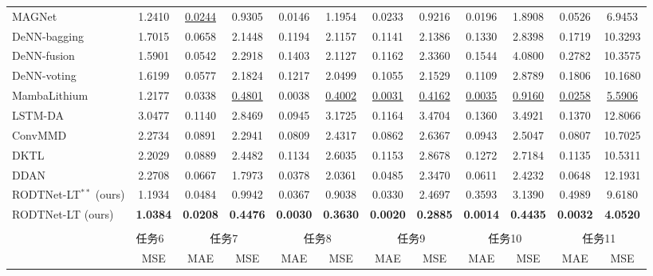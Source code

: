 \documentclass[lettersize,onecolumn]{IEEEtran}
\begin{document}
\begin{table}[htbp]
{\begin{threeparttable}
\begin{tabular}{lccccccccccc}
    MAGNet \cite{TAN2024103725} & 1.2410  & \underline{0.0244}  & 0.9305  & 0.0146  & 1.1954  & 0.0233  & 0.9216  & 0.0196  & 1.8908  & 0.0526  & 6.9453  \\
    DeNN-bagging \cite{10102497} & 1.7015  & 0.0658  & 2.1448  & 0.1194  & 2.1157  & 0.1141  & 2.1386  & 0.1330  & 2.8398  & 0.1719  & 10.3293  \\
    DeNN-fusion \cite{10102497} & 1.5901  & 0.0542  & 2.2918  & 0.1403  & 2.1127  & 0.1162  & 2.3360  & 0.1544  & 4.0800  & 0.2782  & 10.3575  \\
    DeNN-voting \cite{10102497} & 1.6199  & 0.0577  & 2.1824  & 0.1217  & 2.0499  & 0.1055  & 2.1529  & 0.1109  & 2.8789  & 0.1806  & 10.1680  \\
    MambaLithium \cite{shi2024mambalithiumselectivestatespace} & 1.2177  & 0.0338  & \underline{0.4801}  & 0.0038  & \underline{0.4002}  & \underline{0.0031}  & \underline{0.4162}  & \underline{0.0035}  & \underline{0.9160}  & \underline{0.0258}  & \underline{5.5906}  \\
    LSTM-DA \cite{HAN2022230823} & 3.0477  & 0.1140  & 2.8469  & 0.0945  & 3.1725  & 0.1164  & 3.4704  & 0.1360  & 3.4921  & 0.1370  & 12.8066  \\
    ConvMMD \cite{9788003} & 2.2734  & 0.0891  & 2.2941  & 0.0809  & 2.4317  & 0.0862  & 2.6367  & 0.0943  & 2.5047  & 0.0807  & 10.7025  \\
    DKTL \cite{10029904}  & 2.2029  & 0.0889  & 2.4482  & 0.1134  & 2.6035  & 0.1153  & 2.8678  & 0.1272  & 2.7184  & 0.1135  & 10.5311  \\
    DDAN \cite{9560040}  & 2.2708  & 0.0667  & 1.7973  & 0.0378  & 2.0361  & 0.0485  & 2.3470  & 0.0611  & 2.4232  & 0.0648  & 12.1931  \\
    RODTNet-LT$^{\ast\ast}$ {(ours)} & 1.1934  & 0.0484  & 0.9942  & 0.0367  & 0.9038  & 0.0330  & 2.4697  & 0.3593  & 3.1390  & 0.4989  & 9.6180  \\
    RODTNet-LT (ours) & \textbf{1.0384} & \textbf{0.0208} & \textbf{0.4476} & \textbf{0.0030} & \textbf{0.3630} & \textbf{0.0020} & \textbf{0.2885} & \textbf{0.0014} & \textbf{0.4435} & \textbf{0.0032} & \textbf{4.0520} \\
    \midrule
    \multicolumn{12}{c}{} \\
    \midrule
            & \multicolumn{1}{l}{任务6} & \multicolumn{2}{c}{任务7} & \multicolumn{2}{c}{任务8} & \multicolumn{2}{c}{任务9} & \multicolumn{2}{c}{任务10} & \multicolumn{2}{c}{任务11} \\
\cmidrule{2-12}          & MSE   & MAE   & MSE   & MAE   & MSE   & MAE   & MSE   & MAE   & MSE   & MAE   & MSE \\

\end{tabular}
\end{threeparttable}}
\end{table}
\end{document}
